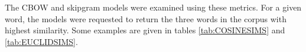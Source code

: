 \newpage
The CBOW and skipgram models were examined using these metrics. For a given word, the models were requested to return the three words in the corpus with highest similarity. Some examples are given in tables \ref{tab:COSINESIMS} and \ref{tab:EUCLIDSIMS}.
%
